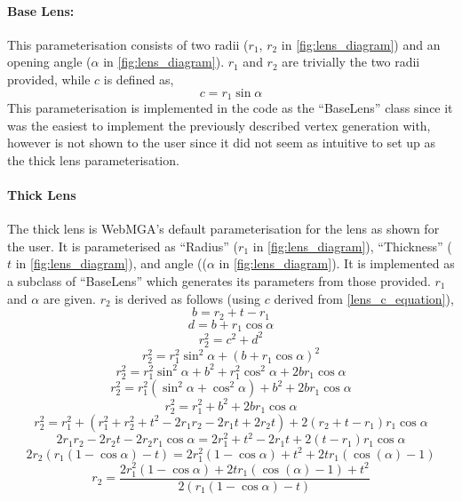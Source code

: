 \paragraph{Base Lens:}
\label{base_lens_para}
This parameterisation consists of two radii ($r_1$, $r_2$ in  \cref{fig:lens_diagram}) and an opening angle ($\alpha$ in  \cref{fig:lens_diagram}). $r_1$ and $r_2$ are trivially the two radii provided, while $c$ is defined as,
\begin{equation}
c=r_1\sin\alpha
\label{lens_c_equation}
\end{equation}
This parameterisation is implemented in the code as the ``BaseLens'' class since it was the easiest to implement the previously described vertex generation with, however is not shown to the user since it did not seem as intuitive to set up as the thick lens parameterisation.
\paragraph{Thick Lens}
The thick lens is WebMGA's default parameterisation for the lens as shown for the user. It is parameterised as ``Radius'' ($r_1$ in \cref{fig:lens_diagram}), ``Thickness'' ($t$ in \cref{fig:lens_diagram}), and angle (($\alpha$ in \cref{fig:lens_diagram}). It is implemented as a subclass of ``BaseLens'' which generates its parameters from those provided. $r_1$ and $\alpha$ are given. $r_2$ is derived as follows (using $c$ derived from \cref{lens_c_equation}),
\begin{equation}
b= r_2+t-r_1
\end{equation}
\begin{equation}
d=b+r_1\cos\alpha
\end{equation}
\begin{equation}
r_2^2=c^2+d^2
\end{equation}
\begin{equation}
r_2^2=r_1^2\sin^2\alpha+(b+r_1\cos\alpha)^2
\end{equation}
\begin{equation}
r_2^2=r_1^2\sin^2\alpha+b^2+r_1^2\cos^2\alpha + 2br_1\cos\alpha
\end{equation}
\begin{equation}
r_2^2=r_1^2(\sin^2\alpha+\cos^2\alpha)+b^2 + 2br_1\cos\alpha
\end{equation}
\begin{equation}
r_2^2=r_1^2+b^2+ 2br_1\cos\alpha
\end{equation}
\begin{equation}
r_2^2=r_1^2+(r_1^2+r_2^2+t^2-2r_1r_2-2r_1t+2r_2t) + 2(r_2+t-r_1)r_1\cos\alpha
\end{equation}
\begin{equation}
2r_1r_2-2r_2t-2r_2r_1\cos\alpha=2r_1^2+t^2-2r_1t + 2(t-r_1)r_1\cos\alpha
\end{equation}
\begin{equation}
2r_2(r_1(1-\cos\alpha)-t)=2r_1^2(1-\cos\alpha)+t^2+2tr_1(\cos(\alpha)-1)
\end{equation}
\begin{equation}
r_2=\frac{2r_1^2(1-\cos\alpha)+2tr_1(\cos(\alpha)-1)+t^2}{2(r_1(1-\cos\alpha)-t)}
\end{equation}

